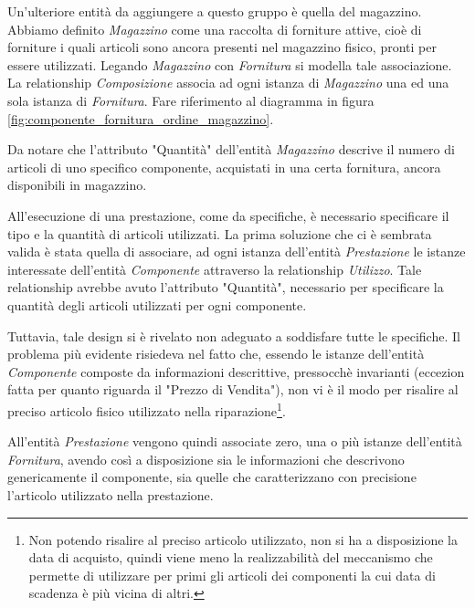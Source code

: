 			Un'ulteriore entità da aggiungere a questo gruppo è quella del magazzino. Abbiamo definito \emph{Magazzino} come una raccolta di forniture attive, cioè di forniture i quali articoli sono ancora presenti nel magazzino fisico, pronti per essere utilizzati. Legando \emph{Magazzino} con \emph{Fornitura} si modella tale associazione. La relationship \emph{Composizione} associa ad ogni istanza di \emph{Magazzino} una ed una sola istanza di \emph{Fornitura}.
			Fare riferimento al diagramma in figura \ref{fig:componente_fornitura_ordine_magazzino}.
			
			Da notare che l'attributo "Quantità" dell'entità \emph{Magazzino} descrive il numero di articoli di uno specifico componente, acquistati in una certa fornitura, ancora disponibili in magazzino.
			
			All'esecuzione di una prestazione, come da specifiche, è necessario specificare il tipo e la quantità di articoli utilizzati. La prima soluzione che ci è sembrata valida è stata quella di associare, ad ogni istanza dell'entità \emph{Prestazione} le istanze interessate dell'entità \emph{Componente} attraverso la relationship \emph{Utilizzo}. Tale relationship avrebbe avuto l'attributo "Quantità", necessario per specificare la quantità degli articoli utilizzati per ogni componente.
			
			Tuttavia, tale design si è rivelato non adeguato a soddisfare tutte le specifiche. Il problema più evidente risiedeva nel fatto che, essendo le istanze dell'entità \emph{Componente} composte da informazioni descrittive, pressocchè invarianti (eccezion fatta per quanto riguarda il "Prezzo di Vendita"), non vi è il modo per risalire al preciso articolo fisico utilizzato nella riparazione\footnote{Non potendo risalire al preciso articolo utilizzato, non si ha a disposizione la data di acquisto, quindi viene meno la realizzabilità del meccanismo che permette di utilizzare per primi gli articoli dei componenti la cui data di scadenza è più vicina di altri.}.
			
			All'entità \emph{Prestazione} vengono quindi associate zero, una o più istanze dell'entità \emph{Fornitura}, avendo così a disposizione sia le informazioni che descrivono genericamente il componente, sia quelle che caratterizzano con precisione l'articolo utilizzato nella prestazione. 

